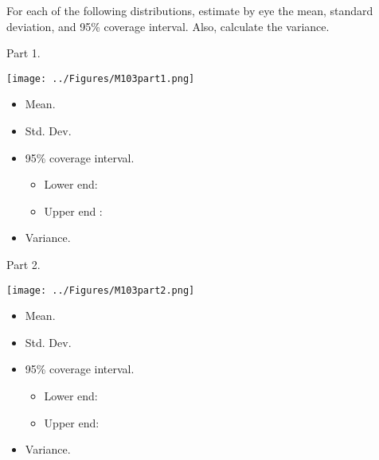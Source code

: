 For each of the following distributions, estimate by eye the mean, 
standard deviation, and 95\% coverage interval.  Also, calculate the variance.

\bigskip

\noindent Part 1.

\centerline{\texttt{[image: ../Figures/M103part1.png]}}

\begin{itemize}
\item Mean.  %
\item Std. Dev.  %
\item 95\% coverage interval.  
\begin{itemize}
\item Lower end:  %

\item Upper end : %
\end{itemize}
\item Variance. 
\end{itemize}

\bigskip

\noindent Part 2.

\centerline{\texttt{[image: ../Figures/M103part2.png]}}

\begin{itemize}
\item Mean.  %
\item Std. Dev.  %
\item 95\% coverage interval.  
\begin{itemize}
\item Lower end: %

\item Upper end:  %
\end{itemize}

\item Variance.  %
\end{itemize}


